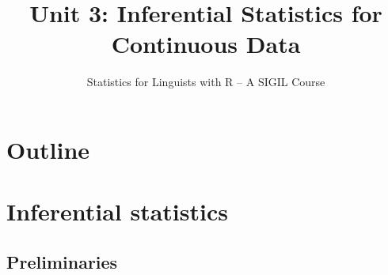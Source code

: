 \documentclass[t]{beamer} %
\title[3b.\ Continuous Data: Inference]{Unit 3: Inferential Statistics for Continuous Data}
\subtitle{Statistics for Linguists with R -- A SIGIL Course}
\date[sigil.r-forge.r-project.org]{%
  \light{\tiny \sigilcopyright}}
\begin{document}
\frame{\titlepage}


\section*{Outline}

\section{Inferential statistics}

\subsection{Preliminaries}
\end{document}
